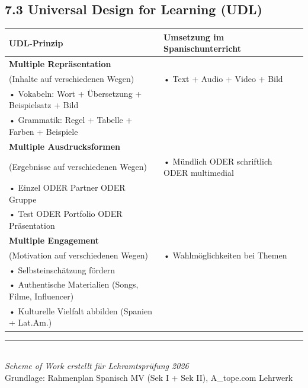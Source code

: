 \documentclass[11pt, a4paper]{article}
\begin{document}
\subsection*{7.3 Universal Design for Learning (UDL)}

\begin{tabularx}{\textwidth}{|L{4cm}|X|}
\hline
{}
\textbf{UDL-Prinzip} & \textbf{Umsetzung im Spanischunterricht} \\
\hline
\textbf{Multiple Repräsentation}\\(Inhalte auf verschiedenen Wegen) &
• Text + Audio + Video + Bild\\
• Vokabeln: Wort + Übersetzung + Beispielsatz + Bild\\
• Grammatik: Regel + Tabelle + Farben + Beispiele \\
\hline
\textbf{Multiple Ausdrucksformen}\\(Ergebnisse auf verschiedenen Wegen) &
• Mündlich ODER schriftlich ODER multimedial\\
• Einzel ODER Partner ODER Gruppe\\
• Test ODER Portfolio ODER Präsentation \\
\hline
\textbf{Multiple Engagement}\\(Motivation auf verschiedenen Wegen) &
• Wahlmöglichkeiten bei Themen\\
• Selbsteinschätzung fördern\\
• Authentische Materialien (Songs, Filme, Influencer)\\
• Kulturelle Vielfalt abbilden (Spanien + Lat.Am.) \\
\hline
\end{tabularx}

\vspace{12pt}

\begin{center}
\rule{0.6\textwidth}{0.4pt}\\[6pt]
{\small\textit{Scheme of Work erstellt für Lehramtsprüfung 2026}}\\
{\footnotesize Grundlage: Rahmenplan Spanisch MV (Sek I + Sek II), A\_tope.com Lehrwerk}
\end{center}
\end{document}
